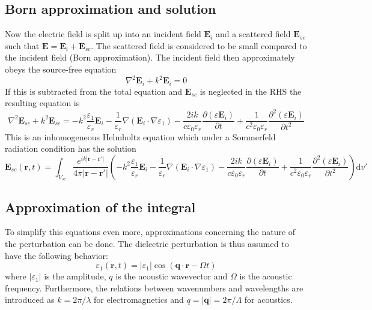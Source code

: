 \documentclass[10pt,a4paper]{eitExjobb}
\begin{document}
	\subsection{Born approximation and solution}
	Now the electric field is split up into an incident field $\bm{E}_i$ and a scattered field $\bm{E}_{sc}$ such that $\bm{E} = \bm{E}_i + \bm{E}_{sc}$. The scattered field is considered to be small compared to the incident field (Born approximation). The incident field then approximately obeys the source-free equation
	\begin{equation*}
	\nabla^2 \bm{E}_{i} + k^2 \bm{E}_{i} = 0
	\end{equation*}
	If this is subtracted from the total equation and $\bm{E}_{sc}$ is neglected in the RHS the resulting equation is
	\begin{equation*}
	\nabla^2\bm{E}_{sc} + k^2 \bm{E}_{sc} =	-k^2 \frac{\varepsilon_1}{\varepsilon_r} \bm{E}_i -\frac{1}{\varepsilon_r}\nabla(\bm{E}_i \cdot \nabla \varepsilon_1) - \frac{2ik}{c\varepsilon_0\varepsilon_r} \frac{\partial (\varepsilon \bm{E}_i)}{\partial t} + \frac{1}{c^2 \varepsilon_0 \varepsilon_r} \frac{\partial^2 (\varepsilon \bm{E}_i)}{\partial t^2}
	\end{equation*}
	This is an inhomogeneous Helmholtz equation which under a Sommerfeld radiation condition has the solution 
	\begin{equation*}
	\boxed{
		\bm{E}_{sc}(\bm{r},t) = \int_{V_{sc}} \frac{e^{ik |\bm{r}-\bm{r'}| }}{4\pi |\bm{r}-\bm{r'}|} \left( -k^2 \frac{\varepsilon_1}{\varepsilon_r} \bm{E}_i -\frac{1}{\varepsilon_r}\nabla(\bm{E}_i \cdot \nabla \varepsilon_1) - \frac{2ik}{c\varepsilon_0\varepsilon_r} \frac{\partial (\varepsilon \bm{E}_i)}{\partial t} + \frac{1}{c^2 \varepsilon_0 \varepsilon_r} \frac{\partial^2 (\varepsilon \bm{E}_i)}{\partial t^2} \right) \mathrm{d}v'
	}
	\end{equation*}
	
	\subsection{Approximation of the integral}
	To simplify this equations even more, approximations concerning the nature of the perturbation can be done. The dielectric perturbation is thus assumed to have the following behavior:
	\begin{equation*}
	\varepsilon_1 (\bm{r},t) = |\varepsilon_1| \cos(\bm{q} \cdot \bm{r} - \Omega t)
	\end{equation*}
	where $|\varepsilon_1|$ is the amplitude, $q$ is the acoustic wavevector and $\Omega$ is the acoustic frequency. Furthermore, the relations between wavenumbers and wavelengths are introduced as $k = 2\pi/\lambda$ for electromagnetics and $q = |\bm{q}| = 2\pi/\Lambda$ for acoustics.
	
\end{document}
